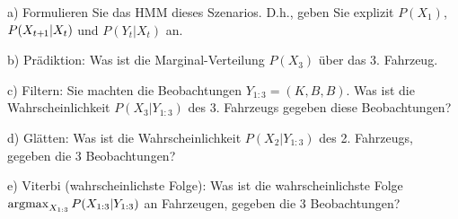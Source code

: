 a) Formulieren Sie das HMM dieses Szenarios. D.h., geben Sie explizit
$P(X_1)$, $P(X_{t{{\hspace*{-.0pt}\text{\rm +}\hspace*{-.5pt}}1}}|X_t)$ und $P(Y_t|X_t)$ an.

b) Prädiktion: Was ist die Marginal-Verteilung $P(X_3)$ über das
3. Fahrzeug.

c) Filtern: Sie machten die Beobachtungen $Y_{1:3}=(K, B,
B)$. Was ist die Wahrscheinlichkeit $P(X_3|Y_{1:3})$ des 3. Fahrzeugs
gegeben diese Beobachtungen?

d) Glätten: Was ist die Wahrscheinlichkeit $P(X_2|Y_{1:3})$ des 2. Fahrzeugs,
gegeben die 3 Beobachtungen?

e) Viterbi (wahrscheinlichste Folge): Was ist die wahrscheinlichste
Folge \\ $\operatorname*{argmax}_{X_{1:3}} P(X_{1:3}|Y_{1:3})$ an Fahrzeugen, gegeben
  die 3 Beobachtungen?


\exerfoot
